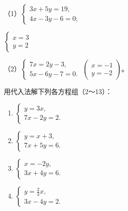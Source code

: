 （1）\(\left\{ \begin{array}{l} 3x + 5y = 19, \\ 4x - 3y - 6 = 0; \end{array} \right.\)

\(\left\{ \begin{array}{l} x = 3 \\ y = 2 \end{array} \right.\)

（2）\(\left\{ \begin{array}{l} 7x = 2y - 3, \\ 5x - 6y - 7 = 0. \end{array} \right.\) \(\left( \begin{array}{l} x = -1 \\ y = -2 \end{array} \right)\)。

用代入法解下列各方程组（2～13）：

\begin{enumerate}[start=2]
\item
  \(\left\{ \begin{array}{l} y = 3x, \\ 7x - 2y = 2. \end{array} \right.\)
\item
  \(\left\{ \begin{array}{l} y = x + 3, \\ 7x + 5y = 6. \end{array} \right.\)
\item
  \(\left\{ \begin{array}{l} x = -2y, \\ 3x + 4y = 6. \end{array} \right.\)
\item
  \(\left\{ \begin{array}{l} y = \frac{2}{3} x, \\ 3x - 4y = 2. \end{array} \right.\)
\end{enumerate}

